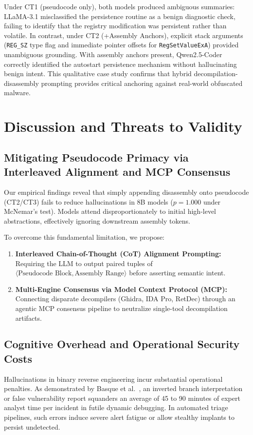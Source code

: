 \documentclass[conference]{IEEEtran}
\begin{document}
Under CT1 (pseudocode only), both models produced ambiguous summaries: LLaMA-3.1 misclassified the persistence routine as a benign diagnostic check, failing to identify that the registry modification was persistent rather than volatile. In contrast, under CT2 (+Assembly Anchors), explicit stack arguments (\texttt{REG\_SZ} type flag and immediate pointer offsets for \texttt{RegSetValueExA}) provided unambiguous grounding. With assembly anchors present, Qwen2.5-Coder correctly identified the autostart persistence mechanism without hallucinating benign intent. This qualitative case study confirms that hybrid decompilation-disassembly prompting provides critical anchoring against real-world obfuscated malware.

\section{Discussion and Threats to Validity}

\subsection{Mitigating Pseudocode Primacy via Interleaved Alignment and MCP Consensus}
Our empirical findings reveal that simply appending disassembly onto pseudocode (CT2/CT3) fails to reduce hallucinations in 8B models ($p = 1.000$ under McNemar's test). Models attend disproportionately to initial high-level abstractions, effectively ignoring downstream assembly tokens.

To overcome this fundamental limitation, we propose:
\begin{enumerate}
    \item \textbf{Interleaved Chain-of-Thought (CoT) Alignment Prompting:} Requiring the LLM to output paired tuples of $\langle \text{Pseudocode Block}, \text{Assembly Range} \rangle$ before asserting semantic intent.
    \item \textbf{Multi-Engine Consensus via Model Context Protocol (MCP):} Connecting disparate decompilers (Ghidra, IDA Pro, RetDec) through an agentic MCP consensus pipeline to neutralize single-tool decompilation artifacts.
\end{enumerate}

\subsection{Cognitive Overhead and Operational Security Costs}
Hallucinations in binary reverse engineering incur substantial operational penalties. As demonstrated by Basque et al.~\cite{basque2026overhead}, an inverted branch interpretation or false vulnerability report squanders an average of 45 to 90 minutes of expert analyst time per incident in futile dynamic debugging. In automated triage pipelines, such errors induce severe alert fatigue or allow stealthy implants to persist undetected.
\end{document}
